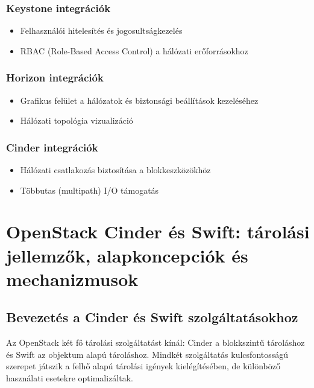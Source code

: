 \documentclass[a4paper,12pt]{article}
\begin{document}
    \subsubsection{Keystone integrációk}

    \begin{itemize}
        \item Felhasználói hitelesítés és jogosultságkezelés
        \item RBAC (Role-Based Access Control) a hálózati erőforrásokhoz
    \end{itemize}

    \subsubsection{Horizon integrációk}

    \begin{itemize}
        \item Grafikus felület a hálózatok és biztonsági beállítások kezeléséhez
        \item Hálózati topológia vizualizáció
    \end{itemize}

    \subsubsection{Cinder integrációk}

    \begin{itemize}
        \item Hálózati csatlakozás biztosítása a blokkeszközökhöz
        \item Többutas (multipath) I/O támogatás
    \end{itemize}

    \newpage


    \section{OpenStack Cinder és Swift: tárolási jellemzők, alapkoncepciók és mechanizmusok}

    \subsection{Bevezetés a Cinder és Swift szolgáltatásokhoz}

    Az OpenStack két fő tárolási szolgáltatást kínál: Cinder a blokkszintű tároláshoz és Swift az objektum alapú tároláshoz. Mindkét szolgáltatás kulcsfontosságú szerepet játszik a felhő alapú tárolási igények kielégítésében, de különböző használati esetekre optimalizáltak.
\end{document}
